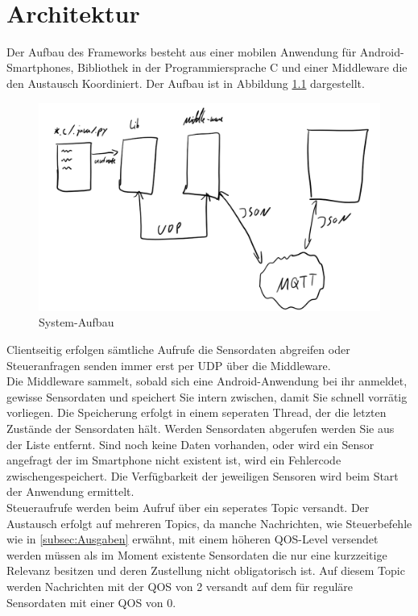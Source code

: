 \documentclass[11pt,a4paper]{report}
\begin{document}
\

\chapter{Architektur} \label{chap:architektur}
Der Aufbau des Frameworks besteht aus einer mobilen Anwendung für Android-Smartphones, Bibliothek in der Programmiersprache C und einer Middleware die den Austausch Koordiniert.
Der Aufbau ist in Abbildung \ref{fig:design} dargestellt.
\begin{figure}[htbp]
  \centering
  \includegraphics[width=.9\textwidth]{images/design.png}
  \caption{System-Aufbau}
  \label{fig:design}
\end{figure}
Clientseitig erfolgen sämtliche Aufrufe die Sensordaten abgreifen oder Steueranfragen senden immer erst per UDP über die Middleware.
\\
Die Middleware sammelt, sobald sich eine Android-Anwendung bei ihr anmeldet, gewisse Sensordaten und speichert Sie intern zwischen, damit Sie schnell vorrätig vorliegen.
Die Speicherung erfolgt in einem seperaten Thread, der die letzten Zustände der Sensordaten hält.
Werden Sensordaten abgerufen werden Sie aus der Liste entfernt.
Sind noch keine Daten vorhanden, oder wird ein Sensor angefragt der im Smartphone nicht existent ist, wird ein Fehlercode zwischengespeichert.
Die Verfügbarkeit der jeweiligen Sensoren wird beim Start der Anwendung ermittelt.
\\
Steueraufrufe werden beim Aufruf über ein seperates Topic versandt.
Der Austausch erfolgt auf mehreren Topics, da manche Nachrichten, wie Steuerbefehle wie in \ref{subsec:Ausgaben} erwähnt, mit einem höheren QOS-Level versendet werden müssen als im Moment existente Sensordaten die nur eine kurzzeitige Relevanz besitzen und deren Zustellung nicht obligatorisch ist.
Auf diesem Topic werden Nachrichten mit der QOS von 2 versandt auf dem für reguläre Sensordaten mit einer QOS von 0.
\end{document}

